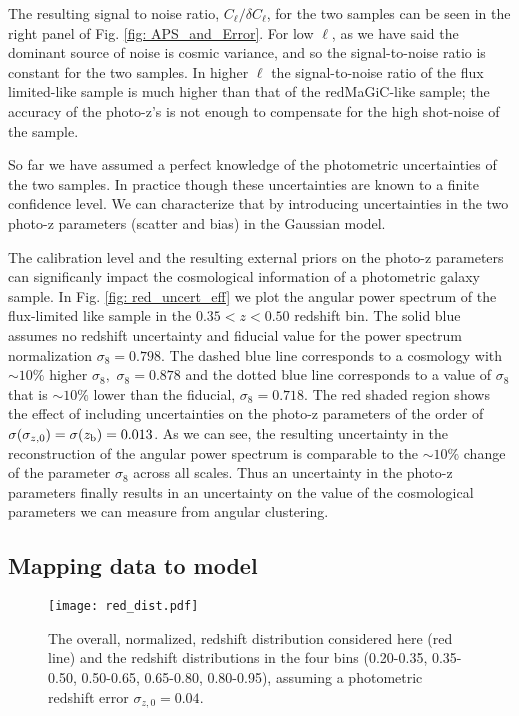 \documentclass[a4paper,fleqn,usenatbib]{mnras}
\begin{document}
The resulting signal to noise ratio, $C_\ell/\delta C_\ell$,  for the two samples can be seen in the right panel of Fig. \ref{fig: APS_and_Error}. For low $\ell$, as we have said the dominant source of noise is cosmic variance, and so the signal-to-noise ratio is constant for the two samples. In higher $\ell$ the signal-to-noise ratio of the flux limited-like sample is much higher than that of the  redMaGiC-like sample; the accuracy of the photo-z's is not enough to compensate for the high shot-noise of the sample. 

So far we have assumed a perfect knowledge of the photometric uncertainties of the two samples. In practice though these uncertainties are known to a finite confidence level. We can characterize that by introducing uncertainties in the two photo-z parameters (scatter and bias) in the Gaussian model. 

The calibration level and the resulting external priors on the photo-z parameters can significanly impact the cosmological information of a photometric galaxy sample. In Fig. \ref{fig: red_uncert_eff} we plot the angular power spectrum of the flux-limited like sample in the $0.35 < z < 0.50$ redshift bin. The solid blue assumes no redshift uncertainty and fiducial value for the power spectrum normalization $\sigma_8 = 0.798$.  The dashed blue line corresponds to a cosmology with $ \sim 10\%$ higher $\sigma_8 , \,\, \sigma_8 = 0.878$ and the dotted blue line corresponds to a value of $\sigma_8$ that is $\sim 10\%$ lower than the fiducial, $\sigma_8 = 0.718$. The red shaded region shows the effect of including uncertainties on the photo-z parameters of the order of $\sigma(\sigma_{z,0}) = \sigma(z_{\mbox{\scriptsize{b}}}) = 0.013$. As we can see, the resulting uncertainty in the reconstruction of the angular power spectrum is comparable to the $\sim 10\%$ change of the parameter $\sigma_8$ across all scales. Thus an uncertainty in the photo-z parameters finally results  in an uncertainty on the value of the cosmological parameters we can measure from angular clustering.
 




\subsection{Mapping data to model}

\begin{figure}
\centering
\texttt{[image: red\_dist.pdf]} 
\caption{The overall, normalized, redshift distribution considered here (red line)  and the redshift distributions in the four bins (0.20-0.35, 0.35-0.50, 0.50-0.65, 0.65-0.80, 0.80-0.95), assuming a photometric redshift error $\sigma_{z,0}=0.04$.}
\label{fig: red_dist_mod}
\end{figure}
\end{document}
